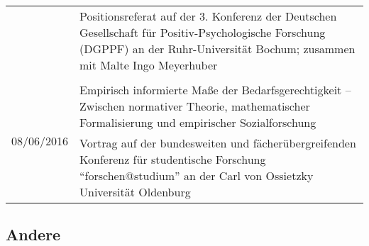 \documentclass[a4paper,10pt]{article}
\begin{document}
\begin{longtable}{p{}p{}}
& \footnotesize{Positionsreferat auf der 3. Konferenz der Deutschen Gesellschaft für Positiv-Psychologische Forschung (DGPPF) an der Ruhr-Universität Bochum; zusammen mit Malte Ingo Meyerhuber}\\
\\
\multirow{2}{1,75cm}{\footnotesize{08/06/2016}} & Empirisch informierte Maße der Bedarfsgerechtigkeit -- Zwischen normativer Theorie, mathematischer Formalisierung und empirischer Sozialforschung\\
& \footnotesize{Vortrag auf der bundesweiten und fächerübergreifenden Konferenz für studentische Forschung \enquote{forschen@studium} an der Carl von Ossietzky Universität Oldenburg}\\
\end{longtable}

\subsection*{Andere}
\end{document}
